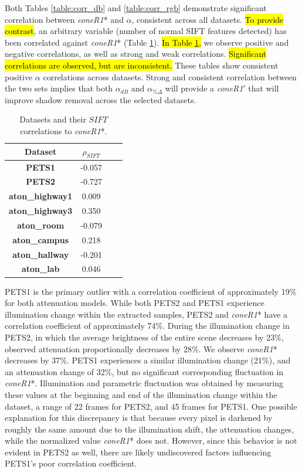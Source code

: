 Both Tables \ref{table:corr_db} and \ref{table:corr_rgb} demonstrate significant correlation between \textit{coneR1}* and $\alpha$, consistent across all datasets. \hl{To provide contrast}, an arbitrary variable (number of normal SIFT features detected) has been correlated against \textit{coneR1}* (Table \ref{table:bad_corr}). \hl{In Table \ref{table:bad_corr},} we observe positive and negative correlations, as well as strong and weak correlations.  \hl{Significant correlations are observed, but are inconsistent.} These tables show consistent positive $\alpha$ correlations across datasets. Strong and consistent correlation between the two sets implies that both $\alpha_{dB}$ and $\alpha_{\%\Delta}$ will provide a \textit{coneR1}$'$ that will improve shadow removal across the selected datasets.

\begin{table}
\centering
\begin{tabular}{ |c|c|c|c| }
	\hline
	\textbf{Dataset} & \textbf{$\rho_{SIFT}$} \\
	\hline
	\hline
	\textbf{PETS1} & -0.057 \\
	\hline
	\textbf{PETS2} & -0.727 \\
	\hline
	\textbf{aton\_highway1} & 0.009 \\
	\hline
	\textbf{aton\_highway3} & 0.350 \\
	\hline
	\textbf{aton\_room} & -0.079 \\
	\hline
	\textbf{aton\_campus} & 0.218 \\
	\hline
	\textbf{aton\_hallway} & -0.201 \\
	\hline
	\textbf{aton\_lab} & 0.046 \\
	\hline
\end{tabular}
\caption{Datasets and their $SIFT$ correlations to \textit{coneR1}*.}
\label{table:bad_corr}
\end{table}

PETS1 is the primary outlier with a correlation coefficient of approximately 19\% for both attenuation models. While both PETS2 and PETS1 experience illumination change within the extracted samples, PETS2 and \textit{coneR1}* have a correlation coefficient of approximately 74\%. During the illumination change in PETS2, in which the average brightness of the entire scene decreases by 23\%, observed attenuation proportionally decreases by 28\%. We observe \textit{coneR1}* decreases by 37\%. PETS1 experiences a similar illumination change (21\%), and an attenuation change of 32\%, but no significant corresponding fluctuation in \textit{coneR1}*. Illumination and parametric fluctuation was obtained by measuring these values at the beginning and end of the illumination change within the dataset, a range of 22 frames for PETS2, and 45 frames for PETS1. One possible explanation for this discrepancy is that because every pixel is darkened by roughly the same amount due to the illumination shift, the attenuation changes, while the normalized value \textit{coneR1}* does not. However, since this behavior is not evident in PETS2 as well, there are likely undiscovered factors influencing PETS1's poor correlation coefficient.

